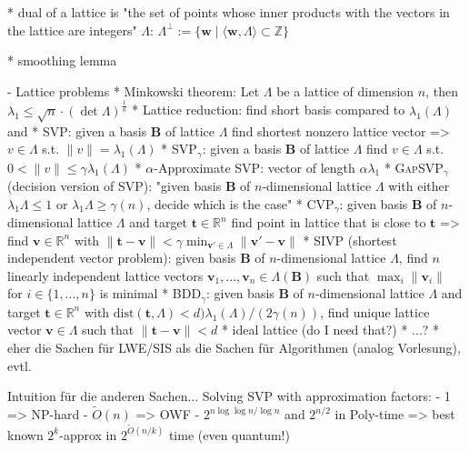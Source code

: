\documentclass[
  a4paper,  %
  twoside,  %
  bibliography=totoc,
  headsepline,
  cleardoublepage=empty,
  parskip=half,
  draft=false
]{scrbook}
\begin{document}
  
  * dual of a lattice is "the set of points whose inner products with the vectors in the lattice are integers" $\Lambda$: $\Lambda^{\perp} := \{ \textbf{w} \mid \langle \textbf{w}, \Lambda \rangle \subset \mathbb{Z}\}$
    
    
  * smoothing lemma
    

- Lattice problems
  * Minkowski theorem: Let $\Lambda$ be a lattice of dimension $n$, then $\lambda_1 \leq \sqrt{n} \cdot (\det \Lambda)^{\frac{1}{n}}$
  * Lattice reduction: find short basis compared to $\lambda_1(\Lambda)$ and 
  * SVP: given a basis $\textbf{B}$ of lattice $\Lambda$ find shortest nonzero lattice vector =>  $v\in \Lambda$ s.t. $\| v \| = \lambda_1(\Lambda)$
  * SVP$_\gamma$: given a basis $\textbf{B}$ of lattice $\Lambda$ find  $v\in \Lambda$ s.t. $0 < \| v \| \leq \gamma \lambda_1(\Lambda)$
  * $\alpha$-Approximate SVP: vector of length $\alpha \lambda_1$
  * \textsc{GapSVP}$_\gamma$ (decision version of \textsc{SVP}): "given basis $\textbf{B}$ of $n$-dimensional lattice $\Lambda$ with either $\lambda_1{\Lambda} \leq 1$ or $\lambda_1{\Lambda} \geq \gamma(n)$, decide which is the case" %
  * CVP$_\gamma$: given  basis $\textbf{B}$ of $n$-dimensional lattice $\Lambda$ and target $\textbf{t}\in\mathbb{R}^n$ find point in lattice that is close to $\textbf{t}$ => find  $\textbf{v} \in \mathbb{R}^n$ with $\|\textbf{t} - \textbf{v}\| < \gamma \min_{\textbf{v}' \in \Lambda} \|\textbf{v}' - \textbf{v}\|$
  * \textsc{SIVP} (shortest independent vector problem): given  basis $\textbf{B}$ of $n$-dimensional lattice $\Lambda$, find $n$ linearly independent lattice vectors $\textbf{v}_1, ..., \textbf{v}_n \in \Lambda(\textbf{B})$ such that $\max_i \|\textbf{v}_i\|$ for $i \in \{1, ..., n\}$ is minimal
  * BDD$_\gamma$: given basis $\textbf{B}$ of $n$-dimensional lattice $\Lambda$ and target $\textbf{t}\in\mathbb{R}^n$ with $\text{dist}(\textbf{t}, \Lambda) < d ) \lambda_1(\Lambda)/(2\gamma(n))$, find unique lattice vector $\textbf{v} \in \Lambda$ such that $\|\textbf{t} - \textbf{v} \| < d$ %
  * ideal lattice (do I need that?)
  * ...?
  * eher die Sachen für LWE/SIS als die Sachen für Algorithmen (analog Vorlesung), evtl. 
  
  Intuition für die anderen Sachen...
  Solving SVP with approximation factors: %
        - 1 => NP-hard \cite{Ajt98}
        - $\tilde{O}(n)$ => OWF \cite{Ajt96, MR04}
        - $2^{n \log \log n / \log n}$ and $2^{n/2}$ in Poly-time \cite{LLL82}
        => best known $2^k$-approx in $2^{\tilde{O}(n/k)}$ time (even quantum!)
\end{document}
